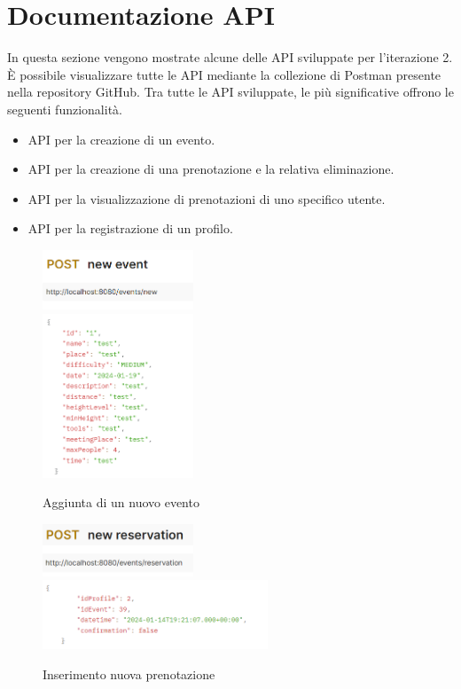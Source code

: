 \section{Documentazione API}
In questa sezione vengono mostrate alcune delle API sviluppate per l’iterazione 2. 
È possibile visualizzare tutte le API mediante la collezione di Postman presente nella repository GitHub.
Tra tutte le API sviluppate, le più significative offrono le seguenti funzionalità.
\begin{itemize}
    \item API per la creazione di un evento.
    \item API per la creazione di una prenotazione e la relativa eliminazione.
    \item API per la visualizzazione di prenotazioni di uno specifico utente.
    \item API per la registrazione di un profilo.
\end{itemize}


\newpage

\begin{figure}[h!]
\includegraphics[width=0.4\textwidth]{Iterazione 2/test/postman/tnewevent.PNG}\\
\includegraphics[width=0.4\textwidth]{Iterazione 2/test/postman/newevent.PNG}\\
\caption{Aggiunta di un nuovo evento}
\end{figure}

\begin{figure}[h!]
\includegraphics[width=0.4\textwidth]{Iterazione 2/test/postman/tnewres.PNG}\\
\includegraphics[width=0.6\textwidth]{Iterazione 2/test/postman/newres.PNG}\\
\caption{Inserimento nuova prenotazione}
\end{figure}


